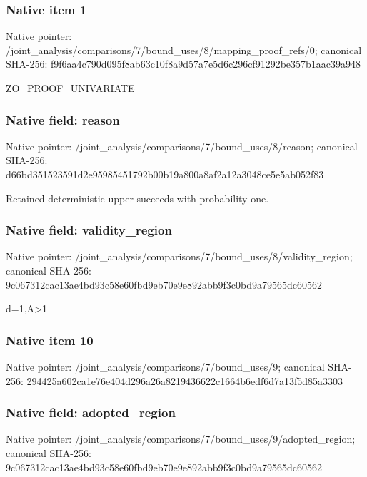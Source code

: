 \documentclass[10pt,a4paper]{article}
\begin{document}
\subsubsection{Native item 1}
Native pointer: /joint\_\allowbreak{}analysis/comparisons/7/bound\_\allowbreak{}uses/8/mapping\_\allowbreak{}proof\_\allowbreak{}refs/0; canonical SHA-256: f9f6aa4c790d095f8ab63c10f8a9d57a7e5d6c296cf91292be357b1aac39a948

\begingroup\raggedright\sloppy ZO\_\allowbreak{}PROOF\_\allowbreak{}UNIVARIATE\par\endgroup

\subsubsection{Native field: reason}
Native pointer: /joint\_\allowbreak{}analysis/comparisons/7/bound\_\allowbreak{}uses/8/reason; canonical SHA-256: d66bd351523591d2e95985451792b00b19a800a8af2a12a3048ce5e5ab052f83

\begingroup\raggedright\sloppy Retained deterministic upper succeeds with probability one.\par\endgroup

\subsubsection{Native field: validity\_\allowbreak{}region}
Native pointer: /joint\_\allowbreak{}analysis/comparisons/7/bound\_\allowbreak{}uses/8/validity\_\allowbreak{}region; canonical SHA-256: 9c067312cac13ae4bd93c58e60fbd9eb70e9e892abb9f3c0bd9a79565dc60562

\begingroup\raggedright\sloppy d=\allowbreak{}1,\allowbreak{}A>1\par\endgroup

\subsubsection{Native item 10}
Native pointer: /joint\_\allowbreak{}analysis/comparisons/7/bound\_\allowbreak{}uses/9; canonical SHA-256: 294425a602ca1e76e404d296a26a8219436622c1664b6edf6d7a13f5d85a3303

\subsubsection{Native field: adopted\_\allowbreak{}region}
Native pointer: /joint\_\allowbreak{}analysis/comparisons/7/bound\_\allowbreak{}uses/9/adopted\_\allowbreak{}region; canonical SHA-256: 9c067312cac13ae4bd93c58e60fbd9eb70e9e892abb9f3c0bd9a79565dc60562
\end{document}
